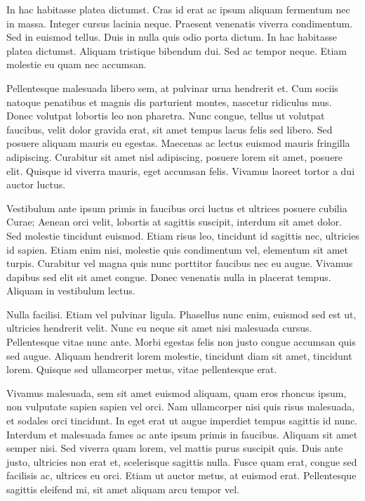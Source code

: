 In hac habitasse platea dictumst. Cras id erat ac ipsum aliquam fermentum nec in massa. Integer cursus lacinia neque. Praesent venenatis viverra condimentum. Sed in euismod tellus. Duis in nulla quis odio porta dictum. In hac habitasse platea dictumst. Aliquam tristique bibendum dui. Sed ac tempor neque. Etiam molestie eu quam nec accumsan.

Pellentesque malesuada libero sem, at pulvinar urna hendrerit et. Cum sociis natoque penatibus et magnis dis parturient montes, nascetur ridiculus mus. Donec volutpat lobortis leo non pharetra. Nunc congue, tellus ut volutpat faucibus, velit dolor gravida erat, sit amet tempus lacus felis sed libero. Sed posuere aliquam mauris eu egestas. Maecenas ac lectus euismod mauris fringilla adipiscing. Curabitur sit amet nisl adipiscing, posuere lorem sit amet, posuere elit. Quisque id viverra mauris, eget accumsan felis. Vivamus laoreet tortor a dui auctor luctus.

Vestibulum ante ipsum primis in faucibus orci luctus et ultrices posuere cubilia Curae; Aenean orci velit, lobortis at sagittis suscipit, interdum sit amet dolor. Sed molestie tincidunt euismod. Etiam risus leo, tincidunt id sagittis nec, ultricies id sapien. Etiam enim nisi, molestie quis condimentum vel, elementum sit amet turpis. Curabitur vel magna quis nunc porttitor faucibus nec eu augue. Vivamus dapibus sed elit sit amet congue. Donec venenatis nulla in placerat tempus. Aliquam in vestibulum lectus.

Nulla facilisi. Etiam vel pulvinar ligula. Phasellus nunc enim, euismod sed est ut, ultricies hendrerit velit. Nunc eu neque sit amet nisi malesuada cursus. Pellentesque vitae nunc ante. Morbi egestas felis non justo congue accumsan quis sed augue. Aliquam hendrerit lorem molestie, tincidunt diam sit amet, tincidunt lorem. Quisque sed ullamcorper metus, vitae pellentesque erat.

Vivamus malesuada, sem sit amet euismod aliquam, quam eros rhoncus ipsum, non vulputate sapien sapien vel orci. Nam ullamcorper nisi quis risus malesuada, et sodales orci tincidunt. In eget erat ut augue imperdiet tempus sagittis id nunc. Interdum et malesuada fames ac ante ipsum primis in faucibus. Aliquam sit amet semper nisi. Sed viverra quam lorem, vel mattis purus suscipit quis. Duis ante justo, ultricies non erat et, scelerisque sagittis nulla. Fusce quam erat, congue sed facilisis ac, ultrices eu orci. Etiam ut auctor metus, at euismod erat. Pellentesque sagittis eleifend mi, sit amet aliquam arcu tempor vel.

